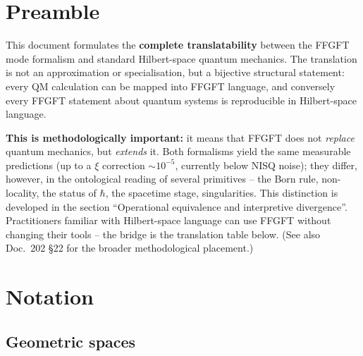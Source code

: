 
\section*{Preamble}

This document formulates the \textbf{complete translatability} between
the FFGFT mode formalism and standard Hilbert-space quantum mechanics.
The translation is not an approximation or specialisation, but a
bijective structural statement: every QM calculation can be mapped
into FFGFT language, and conversely every FFGFT statement about
quantum systems is reproducible in Hilbert-space language.

\textbf{This is methodologically important:} it means that FFGFT does
not \emph{replace} quantum mechanics, but \emph{extends} it. Both
formalisms yield the same measurable predictions (up to a $\xi$
correction $\sim 10^{-5}$, currently below NISQ noise); they differ,
however, in the ontological reading of several primitives -- the Born
rule, non-locality, the status of $\hbar$, the spacetime stage,
singularities. This distinction is developed in the section
``Operational equivalence and interpretive divergence''.
Practitioners familiar with Hilbert-space language can use FFGFT
without changing their tools -- the bridge is the translation table
below. (See also Doc.~202 §22 for the broader methodological
placement.)

\section*{Notation}

\subsection*{Geometric spaces}

